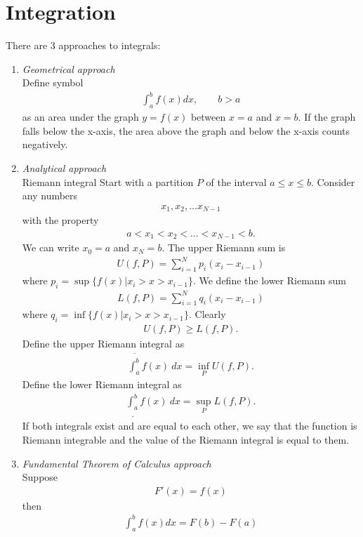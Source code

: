\section{Integration}
\begin{df}
	There are 3 approaches to integrals:
	\begin{enumerate}
		\item
		\emph{Geometrical approach} \\
		Define symbol
		\begin{align*}
		\int_a^b f(x) dx, \qquad b>a 
		\end{align*} as an area under the graph $y = f(x)$ between $x=a$ and $x=b$. If the graph falls below the x-axis, the area above the graph and below the x-axis counts negatively.
		\item
		\emph{Analytical approach} \\
		Riemann integral
		Start with a partition $P$ of the interval $a \le x \le b$. Consider any numbers
		\begin{align*}
		x_1, x_2, \dots x_{N-1}
		\end{align*}
		with the property
		\begin{align*}
		a < x_1 < x_2 < \dots < x_{N-1} < b.
		\end{align*}
		We can write $x_0 = a$ and $x_N = b$. The upper Riemann sum is
		\begin{align*}
		U(f,P) = \sum_{i=1}^N p_i (x_i - x_{i-1})
		\end{align*}
		where $p_i = \sup \{ f(x) | x_i > x > x_{i-1} \}$. We define the lower Riemann sum
		\begin{align*}
		L(f,P) = \sum_{i=1}^N q_i (x_i - x_{i-1})
		\end{align*}
		where $q_i = \inf \{ f(x) | x_i > x > x_{i-1} \}$. Clearly
		\begin{align*}
		U(f,P) \ge L(f,P).
		\end{align*}
		Define the upper Riemann integral as
		\begin{align*}
		\overline{\int_a^b} f(x) ~ dx = \inf_P U(f,P).
		\end{align*}
		Define the lower Riemann integral as
		\begin{align*}
		\underline{\int_a^b} f(x) ~ dx = \sup_P L(f,P).
		\end{align*}
		If both integrals exist and are equal to each other, we say that the function is Riemann integrable and the value of the Riemann integral is equal to them.
		\item
		\emph{Fundamental Theorem of Calculus approach} \\
		Suppose
		\begin{align*}
		F'(x) = f(x)
		\end{align*}
		then
		\begin{align*}
		\int_a^b f(x) dx = F(b) - F(a)
		\end{align*}
	\end{enumerate}
\end{df}

